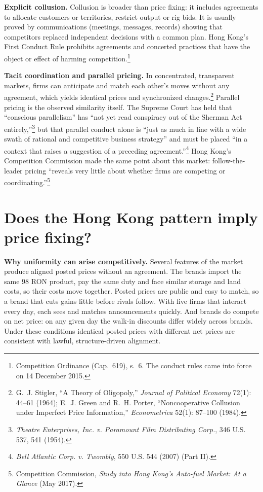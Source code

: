 \documentclass[11pt]{article}
\begin{document}
\textbf{Explicit collusion.} Collusion is broader than price fixing: it includes agreements to allocate customers or territories, restrict output or rig bids. It is usually proved by communications (meetings, messages, records) showing that competitors replaced independent decisions with a common plan. Hong Kong's First Conduct Rule prohibits agreements and concerted practices that have the object or effect of harming competition.\footnote{Competition Ordinance (Cap.~619), s.~6. The conduct rules came into force on 14 December 2015.}

\textbf{Tacit coordination and parallel pricing.} In concentrated, transparent markets, firms can anticipate and match each other's moves without any agreement, which yields identical prices and synchronized changes.\footnote{G.~J. Stigler, ``A Theory of Oligopoly,'' \emph{Journal of Political Economy} 72(1): 44--61 (1964); E.~J. Green and R.~H. Porter, ``Noncooperative Collusion under Imperfect Price Information,'' \emph{Econometrica} 52(1): 87--100 (1984).} Parallel pricing is the observed similarity itself. The Supreme Court has held that ``conscious parallelism'' has ``not yet read conspiracy out of the Sherman Act entirely,''\footnote{\emph{Theatre Enterprises, Inc. v. Paramount Film Distributing Corp.}, 346 U.S. 537, 541 (1954).} but that parallel conduct alone is ``just as much in line with a wide swath of rational and competitive business strategy'' and must be placed ``in a context that raises a suggestion of a preceding agreement.''\footnote{\emph{Bell Atlantic Corp. v. Twombly}, 550 U.S. 544 (2007) (Part II).} Hong Kong's Competition Commission made the same point about this market: follow-the-leader pricing ``reveals very little about whether firms are competing or coordinating.''\footnote{Competition Commission, \emph{Study into Hong Kong's Auto-fuel Market: At a Glance} (May 2017).}

\section{Does the Hong Kong pattern imply price fixing?}

\textbf{Why uniformity can arise competitively.} Several features of the market produce aligned posted prices without an agreement. The brands import the same 98 RON product, pay the same duty and face similar storage and land costs, so their costs move together. Posted prices are public and easy to match, so a brand that cuts gains little before rivals follow. With five firms that interact every day, each sees and matches announcements quickly. And brands do compete on net price: on any given day the walk-in discounts differ widely across brands. Under these conditions identical posted prices with different net prices are consistent with lawful, structure-driven alignment.
\end{document}
